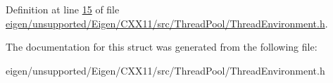 Definition at line \hyperlink{eigen_2unsupported_2_eigen_2_c_x_x11_2src_2_thread_pool_2_thread_environment_8h_source_l00015}{15} of file \hyperlink{eigen_2unsupported_2_eigen_2_c_x_x11_2src_2_thread_pool_2_thread_environment_8h_source}{eigen/unsupported/\+Eigen/\+C\+X\+X11/src/\+Thread\+Pool/\+Thread\+Environment.\+h}.



The documentation for this struct was generated from the following file\+:\begin{DoxyCompactItemize}
\item 
eigen/unsupported/\+Eigen/\+C\+X\+X11/src/\+Thread\+Pool/\+Thread\+Environment.\+h\end{DoxyCompactItemize}
